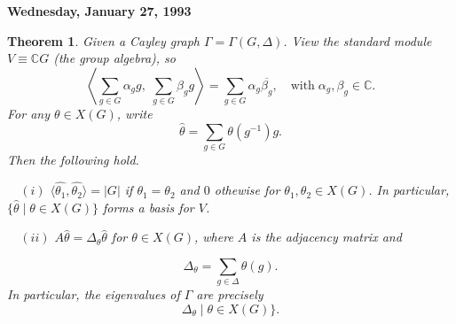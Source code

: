 \documentclass[
]{book}
\newtheorem{theorem}{Theorem}[chapter]
\theoremstyle{definition}
\theoremstyle{definition}
\theoremstyle{definition}
\theoremstyle{definition}
\theoremstyle{remark}
\begin{document}
\textbf{Wednesday, January 27, 1993}

\begin{theorem}
\protect\hypertarget{thm:charcter-group}{}\label{thm:charcter-group}Given a Cayley graph \(\Gamma = \Gamma(G, \Delta)\). View the standard module \(V \equiv \mathbb{C}G\) (the group algebra), so
\[\left\langle \sum_{g\in G}\alpha_g g, \;\sum_{g\in G}\beta_g g\right\rangle = \sum_{g\in G}\alpha_g\overline{\beta_g}, \quad \textrm{with}\; \alpha_g, \beta_g\in \mathbb{C}.\]
For any \(\theta\in X(G)\), write
\[\hat{\theta} = \sum_{g\in G}\theta(g^{-1})g.\]
Then the following hold.

~~\((i)\) \(\langle \hat{\theta_1}, \hat{\theta_2}\rangle = |G|\) if \(\theta_1 = \theta_2\) and \(0\) othewise for \(\theta_1, \theta_2\in X(G)\). In particular, \(\{\hat{\theta}\mid \theta\in X(G)\}\) forms a basis for \(V\).

~~\((ii)\) \(A\hat{\theta} = \Delta_\theta \hat{\theta}\) for \(\theta \in X(G)\), where \(A\) is the adjacency matrix and

\[\Delta_\theta = \sum_{g\in \Delta}\theta(g).\]
In particular, the eigenvalues of \(\Gamma\) are precisely
\[\Delta_\theta \mid \theta\in X(G)\}.\]
\end{theorem}
\end{document}
